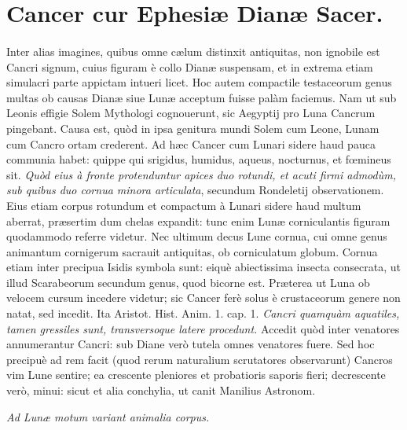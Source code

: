 \documentclass[a4paper, 11pt, oneside, polutonikogreek, latin]{article}
\begin{document}
\section{Cancer cur Ephesiæ Dianæ Sacer.}
\paragraph{}
Inter alias imagines, quibus omne cælum distinxit antiquitas, non ignobile est Cancri signum, cuius figuram è collo Dianæ suspensam, et in extrema etiam simulacri parte appictam intueri licet. Hoc autem compactile testaceorum genus multas ob causas Dianæ siue Lunæ acceptum fuisse palàm faciemus. Nam ut sub Leonis effigie Solem Mythologi cognouerunt, sic Aegyptij pro Luna Cancrum pingebant. Causa est, quòd in ipsa genitura mundi Solem cum Leone, Lunam cum Cancro ortam crederent. Ad hæc Cancer cum Lunari sidere haud pauca communia habet: quippe qui srigidus, humidus, aqueus, nocturnus, et fœmineus sit. \emph{Quòd eius à fronte protenduntur apices duo rotundi, et acuti firmi admodùm, sub quibus duo cornua minora articulata}, secundum Rondeletij observationem. Eius etiam corpus rotundum et compactum à Lunari sidere haud multum aberrat, præsertim dum chelas expandit: tunc enim Lunæ corniculantis figuram quodammodo referre videtur. Nec ultimum decus Lune cornua, cui omne genus animantum cornigerum sacrauit antiquitas, ob corniculatum globum. Cornua etiam inter precipua Isidis symbola sunt: eiquè abiectissima insecta consecrata, ut illud Scarabeorum secundum genus, quod bicorne est. Præterea ut Luna ob velocem cursum incedere videtur; sic Cancer ferè solus è crustaceorum genere non natat, sed incedit. Ita Aristot. Hist. Anim. 1. cap. 1. \emph{Cancri quamquàm aquatiles, tamen gressiles sunt, transversoque latere procedunt.} Accedit quòd inter venatores annumerantur Cancri: sub Diane verò tutela omnes venatores fuere. Sed hoc precipuè ad rem facit (quod rerum naturalium scrutatores observarunt) Cancros vim Lune sentire; ea crescente pleniores et probatioris saporis fieri; decrescente verò, minui: sicut et alia conchylia, ut canit Manilius Astronom.

\emph{Ad Lunæ motum variant animalia corpus.}
\end{document}
